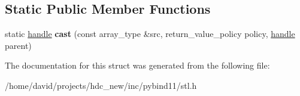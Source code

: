 \subsection*{Static Public Member Functions}
\begin{DoxyCompactItemize}
\item 
static \hyperlink{classhandle}{handle} {\bfseries cast} (const array\+\_\+type \&src, return\+\_\+value\+\_\+policy policy, \hyperlink{classhandle}{handle} parent)\hypertarget{structtype__caster_3_01std_1_1array_3_01_type_00_01_size_01_4_01_4_a7acf892391f0fcbb9b835176a95862a2}{}\label{structtype__caster_3_01std_1_1array_3_01_type_00_01_size_01_4_01_4_a7acf892391f0fcbb9b835176a95862a2}

\end{DoxyCompactItemize}


The documentation for this struct was generated from the following file\+:\begin{DoxyCompactItemize}
\item 
/home/david/projects/hdc\+\_\+new/inc/pybind11/stl.\+h\end{DoxyCompactItemize}
